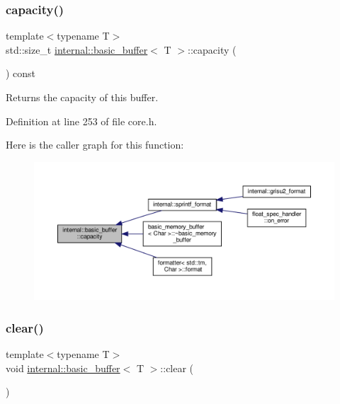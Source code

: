 \subsubsection{\texorpdfstring{capacity()}{capacity()}}
{\footnotesize\ttfamily template$<$typename T$>$ \\
std\+::size\+\_\+t \hyperlink{classinternal_1_1basic__buffer}{internal\+::basic\+\_\+buffer}$<$ T $>$\+::capacity (\begin{DoxyParamCaption}{ }\end{DoxyParamCaption}) const\hspace{0.3cm}{\ttfamily [inline]}}

Returns the capacity of this buffer. 

Definition at line 253 of file core.\+h.

Here is the caller graph for this function\+:
\nopagebreak
\begin{figure}[H]
\begin{center}
\leavevmode
\includegraphics[width=350pt]{classinternal_1_1basic__buffer_ae88bfc1cb8c896fa0b689ad8158cccae_icgraph}
\end{center}
\end{figure}
\mbox{\label{classinternal_1_1basic__buffer_a9a18325765c5245d1861874512355b72}} 
\subsubsection{\texorpdfstring{clear()}{clear()}}
{\footnotesize\ttfamily template$<$typename T$>$ \\
void \hyperlink{classinternal_1_1basic__buffer}{internal\+::basic\+\_\+buffer}$<$ T $>$\+::clear (\begin{DoxyParamCaption}{ }\end{DoxyParamCaption})\hspace{0.3cm}{\ttfamily [inline]}}

